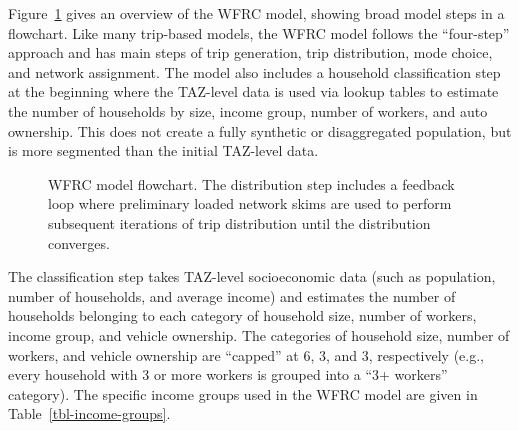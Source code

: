 \documentclass[fancy, twoside, mastersfancy, ms]{byuthesis}
\begin{document}
Figure~\ref{fig-wfrc-flowchart} gives an overview of the WFRC model,
showing broad model steps in a flowchart. Like many trip-based models,
the WFRC model follows the ``four-step'' approach and has main steps of
trip generation, trip distribution, mode choice, and network assignment.
The model also includes a household classification step at the beginning
where the TAZ-level data is used via lookup tables to estimate the
number of households by size, income group, number of workers, and auto
ownership. This does not create a fully synthetic or disaggregated
population, but is more segmented than the initial TAZ-level data.

\begin{figure}


\caption[WFRC model flowchart.]{\label{fig-wfrc-flowchart}WFRC model
flowchart. The distribution step includes a feedback loop where
preliminary loaded network skims are used to perform subsequent
iterations of trip distribution until the distribution converges.}

\end{figure}%

The classification step takes TAZ-level socioeconomic data (such as
population, number of households, and average income) and estimates the
number of households belonging to each category of household size,
number of workers, income group, and vehicle ownership. The categories
of household size, number of workers, and vehicle ownership are
``capped'' at 6, 3, and 3, respectively (e.g., every household with 3 or
more workers is grouped into a ``3+ workers'' category). The specific
income groups used in the WFRC model are given in
Table~\ref{tbl-income-groups}.
\end{document}
